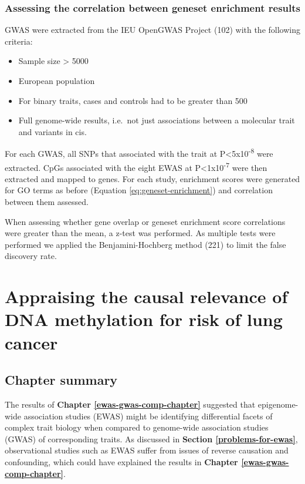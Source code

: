 \documentclass[11pt,oneside]{bristolthesis}
\providecommand{\tightlist}{%
  \setlength{\itemsep}{0pt}\setlength{\parskip}{0pt}}
\begin{document}
\hypertarget{assessing-the-correlation-between-geneset-enrichment-results}{%
\subsection{Assessing the correlation between geneset enrichment results}\label{assessing-the-correlation-between-geneset-enrichment-results}}

GWAS were extracted from the IEU OpenGWAS Project (102) with the following criteria:
\begin{itemize}
\tightlist
\item
  Sample size \textgreater{} 5000
\item
  European population
\item
  For binary traits, cases and controls had to be greater than 500
\item
  Full genome-wide results, i.e.~not just associations between a molecular trait and variants in cis.
\end{itemize}
For each GWAS, all SNPs that associated with the trait at P\textless5x10\textsuperscript{-8} were extracted. CpGs associated with the eight EWAS at P\textless1x10\textsuperscript{-7} were then extracted and mapped to genes. For each study, enrichment scores were generated for GO terms as before (Equation \eqref{eq:geneset-enrichment}) and correlation between them assessed.

When assessing whether gene overlap or geneset enrichment score correlations were greater than the mean, a z-test was performed. As multiple tests were performed we applied the Benjamini-Hochberg method (221) to limit the false discovery rate.

\hypertarget{dnam-lung-cancer-mr}{%
\chapter{Appraising the causal relevance of DNA methylation for risk of lung cancer}\label{dnam-lung-cancer-mr}}

\hypertarget{chapter-summary-07}{%
\section{Chapter summary}\label{chapter-summary-07}}

The results of \textbf{Chapter \ref{ewas-gwas-comp-chapter}} suggested that epigenome-wide association studies (EWAS) might be identifying differential facets of complex trait biology when compared to genome-wide association studies (GWAS) of corresponding traits. As discussed in \textbf{Section \ref{problems-for-ewas}}, observational studies such as EWAS suffer from issues of reverse causation and confounding, which could have explained the results in \textbf{Chapter \ref{ewas-gwas-comp-chapter}}.
\end{document}
